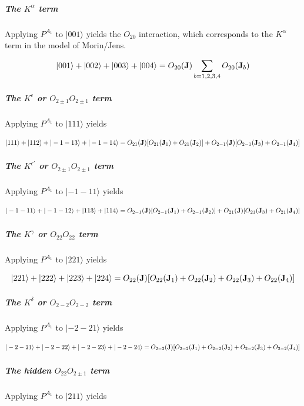 \subparagraph{The $K^{\alpha}$ term}

Applying $P^{A_1}$ to $|001\rangle$ yields the $O_{20}$ interaction, which
corresponds to the $K^{\alpha}$ term in the model of Morin/Jens.

\begin{equation}
|001\rangle+|002\rangle+|003\rangle+|004\rangle =O_{20}(\mathbf J)\sum_{b=1,2,3,4}O_{20}(\mathbf J_b)
\end{equation}

\subparagraph{The $K^{\epsilon}$ or $O_{2\pm1}O_{2\pm1}$ term}

Applying $P^{A_1}$ to $|111\rangle$ yields 

\begin{equation}
|111\rangle+|112\rangle+|-1-13\rangle+|-1-14\rangle =
O_{21}(\mathbf J)[O_{21}(\mathbf J_1)+O_{21}(\mathbf J_2)]+O_{2-1}(\mathbf J)[O_{2-1}(\mathbf J_3)+O_{2-1}(\mathbf J_4)]
\end{equation}

\subparagraph{The $K^{\epsilon'}$ or $O_{2\pm1}O_{2\pm1}$ term}

Applying $P^{A_1}$ to $|-1-11\rangle$ yields 

\begin{equation}
|-1-11\rangle+|-1-12\rangle+|113\rangle+|114\rangle =
O_{2-1}(\mathbf J)[O_{2-1}(\mathbf J_1)+O_{2-1}(\mathbf J_2)]+O_{21}(\mathbf J)[O_{21}(\mathbf J_3)+O_{21}(\mathbf J_4)]
\end{equation}


\subparagraph{The $K^{\gamma}$ or $O_{22}O_{22}$ term}

Applying $P^{A_1}$ to $|221\rangle$ yields 

\begin{equation}
|221\rangle+|222\rangle+|223\rangle+|224\rangle =
O_{22}(\mathbf J)[O_{22}(\mathbf J_1)+O_{22}(\mathbf J_2)+O_{22}(\mathbf J_3)+O_{22}(\mathbf J_4)]
\end{equation}


\subparagraph{The $K^{\delta}$ or $O_{2-2}O_{2-2}$ term}

Applying $P^{A_1}$ to $|-2-21\rangle$ yields 

\begin{equation}
|-2-21\rangle+|-2-22\rangle+|-2-23\rangle+|-2-24\rangle =
O_{2-2}(\mathbf J)[O_{2-2}(\mathbf J_1)+O_{2-2}(\mathbf J_2)+O_{2-2}(\mathbf J_3)+O_{2-2}(\mathbf J_4)]
\end{equation}

\subparagraph{The hidden $O_{22}O_{2\pm1}$ term}

Applying $P^{A_1}$ to $|211\rangle$ yields 

